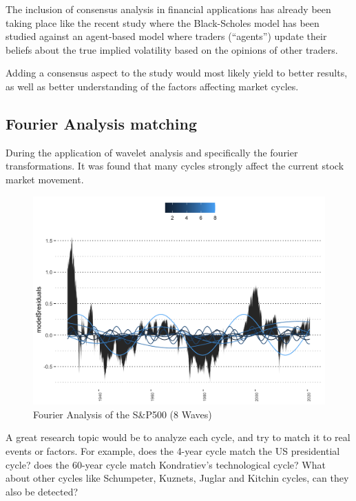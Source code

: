 \documentclass[]{book}
\begin{document}
The inclusion of consensus analysis in financial applications has already been taking place like the recent study where the Black-Scholes model has been studied against an agent-based model where traders (``agents'') update their beliefs about the true implied volatility based on the opinions of other traders. \citep{vaidya2018learning}

Adding a consensus aspect to the study would most likely yield to better results, as well as better understanding of the factors affecting market cycles.

\hypertarget{fourier-analysis-matching}{%
\subsection{Fourier Analysis matching}\label{fourier-analysis-matching}}

During the application of wavelet analysis and specifically the fourier transformations. It was found that many cycles strongly affect the current stock market movement.

\begin{figure}
\centering
\includegraphics{data/8fourier.png}
\caption{\label{fig:unnamed-chunk-113}Fourier Analysis of the S\&P500 (8 Waves)}
\end{figure}

A great research topic would be to analyze each cycle, and try to match it to real events or factors. For example, does the 4-year cycle match the US presidential cycle? does the 60-year cycle match Kondratiev's technological cycle? \citep{mager1987kondratiev} What about other cycles like Schumpeter, Kuznets, Juglar and Kitchin cycles, can they also be detected?
\end{document}
